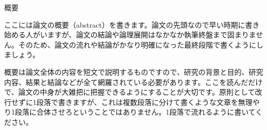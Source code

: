 \thispagestyle{empty}

\begin{center}
  {\large \sf 概要}
\end{center}

ここには論文の概要（abstract）を書きます。論文の先頭なので早い時期に書き始める人がいますが、論文の結論や論理展開はなかなか執筆終盤まで固まりません。そのため、論文の流れや結論がかなり明確になった最終段階で書くようにしましょう。

概要は論文全体の内容を短文で説明するものですので、研究の背景と目的、研究内容、結果と結論などが全て網羅されている必要があります。ここを読んだだけで、論文の中身が大雑把に把握できるようにすることが大切です。原則として改行せずに1段落で書きますが、これは複数段落に分けて書くような文章を無理やり1段落に合体させろということではありません。1段落で流れるように書いてください。


